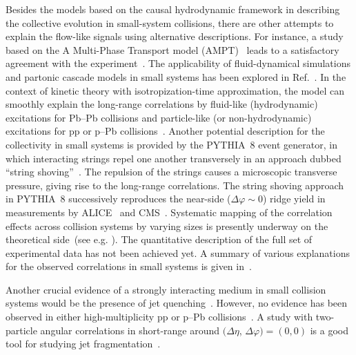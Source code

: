 Besides the models based on the causal hydrodynamic framework in describing the collective evolution in small-system collisions, there are other attempts to explain the flow-like signals using alternative descriptions. For instance, a study based on the A Multi-Phase Transport model (AMPT)~\cite{Lin:2004en} leads to a satisfactory agreement with the experiment~\cite{OrjuelaKoop:2015jss}. The applicability of fluid-dynamical simulations and partonic cascade models in small systems has been explored in Ref.~\cite{Gallmeister:2018mcn}. In the context of kinetic theory with isotropization-time approximation, the model can smoothly explain the long-range correlations by fluid-like (hydrodynamic) excitations for Pb--Pb collisions and particle-like (or non-hydrodynamic) excitations for pp or p--Pb collisions~\cite{Kurkela:2019kip,Kurkela:2020wwb,Ambrus:2021fej}. Another potential description for the collectivity in small systems is provided by the PYTHIA~8 event generator, in which interacting strings repel one another transversely in an approach dubbed ``string shoving''~\cite{Bierlich:2017vhg,Bierlich:2019ixq}. The repulsion of the strings causes a microscopic transverse pressure, giving rise to the long-range correlations. The string shoving approach in PYTHIA~8 successively reproduces the near-side ($\Delta\varphi\sim0$) ridge yield in measurements by ALICE~\cite{ALICE:2021nir} and CMS~\cite{Khachatryan:2016txc}. Systematic mapping of the correlation effects across collision systems by varying sizes is presently underway on the theoretical side~(see e.g. \cite{Schenke:2020mbo}). The quantitative description of the full set of experimental data has not been achieved yet. A summary of various explanations for the observed correlations in small systems is given in~\cite{Strickland:2018exs,Loizides:2016tew,Nagle:2018nvi}. 

Another crucial evidence of a strongly interacting medium in small collision systems would be the presence of jet quenching~\cite{Gyulassy:1990ye,Wang:1991xy}. However, no evidence has been observed in either high-multiplicity pp or p--Pb collisions~\cite{Adam:2014qja,Khachatryan:2016odn,Adam:2016jfp,Adam:2016dau,Acharya:2017okq}. A study with two-particle angular correlations in short-range around $(\Delta\eta$, $\Delta\varphi)=(0,0)$ is a good tool for studying jet fragmentation~\cite{Adam:2016tsv}.

